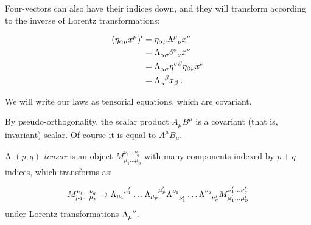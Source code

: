 \documentclass[main.tex]{subfiles}
\begin{document}
Four-vectors can also have their indices down, and they will transform according to the inverse of Lorentz transformations:

\begin{subequations}
\begin{align}
  (\eta_{\alpha\mu} x^\mu)' &=  \eta_{\alpha \mu} \tensor{\Lambda}{^\mu_\nu}x^\nu  \\
  &= \tensor{\Lambda}{_\alpha_\sigma} \tensor{\delta}{^\sigma_\nu} x^\nu  \\
  &= \tensor{\Lambda}{_\alpha_\sigma} \eta^{\sigma \beta} \eta_{\beta \nu} x^\nu  \\
  &= \tensor{\Lambda}{_\alpha^\beta} x_\beta\,.
\end{align}
\end{subequations}

We will write our laws as tensorial equations, which are covariant.

By pseudo-orthogonality, the scalar product \(A_\mu B^\mu\) is a covariant (that is, invariant) scalar. Of course it is equal to \(A^\mu B_\mu\).

\begin{definition}[Tensor]
    A \((p, q)\) \emph{tensor} is an object \(M_{\mu_1 \dots \mu_p}^{\nu_1 \dots \nu_q}\) with many components indexed by \(p+q\) indices, which transforms as:

    \begin{equation}
        M_{\mu_1 \dots \mu_p}^{\nu_1 \dots \nu_q}
        \rightarrow
        \tensor{\Lambda}{_{\mu_1}^{\mu'_1}}\dots
        \tensor{\Lambda}{_{\mu_p}^{\mu'_p}}
        \tensor{\Lambda}{^{\nu_1}_{\nu'_1}}\dots
        \tensor{\Lambda}{^{\nu_q}_{\nu'_q}}
        M_{\mu_1' \dots \mu_p'}^{\nu_1' \dots \nu_q'}
    \end{equation}
    under Lorentz transformations \(\tensor{\Lambda}{_\mu^\nu}\).
\end{definition}
\end{document}
